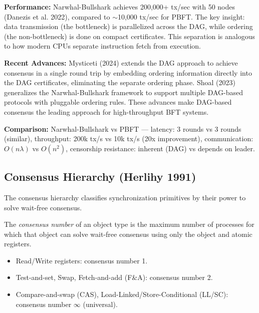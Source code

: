 \textbf{Performance:} Narwhal-Bullshark achieves 200,000+ tx/sec with 50 nodes (Danezis et al. 2022), compared to $\sim$10,000 tx/sec for PBFT. The key insight: data transmission (the bottleneck) is parallelized across the DAG, while ordering (the non-bottleneck) is done on compact certificates. This separation is analogous to how modern CPUs separate instruction fetch from execution.

\textbf{Recent Advances:} Mysticeti (2024) extends the DAG approach to achieve consensus in a single round trip by embedding ordering information directly into the DAG certificates, eliminating the separate ordering phase. Shoal (2023) generalizes the Narwhal-Bullshark framework to support multiple DAG-based protocols with pluggable ordering rules. These advances make DAG-based consensus the leading approach for high-throughput BFT systems.

\textbf{Comparison:} Narwhal-Bullshark vs PBFT — latency: 3 rounds vs 3 rounds (similar), throughput: 200k tx/s vs 10k tx/s (20x improvement), communication: $O(n \lambda)$ vs $O(n^2)$, censorship resistance: inherent (DAG) vs depends on leader.

\subsection{Consensus Hierarchy (Herlihy 1991)}
\label{sec:consensus:hierarchy}

The consensus hierarchy classifies synchronization primitives by their power to solve wait-free consensus.

\begin{definition}
The \emph{consensus number} of an object type is the maximum number of processes for which that object can solve wait-free consensus using only the object and atomic registers.
\end{definition}

\begin{theorem}[Herlihy 1991]
\begin{itemize}
\item Read/Write registers: consensus number 1.
\item Test-and-set, Swap, Fetch-and-add (F\&A): consensus number 2.
\item Compare-and-swap (CAS), Load-Linked/Store-Conditional (LL/SC): consensus number $\infty$ (universal).
\end{itemize}
\end{theorem}

